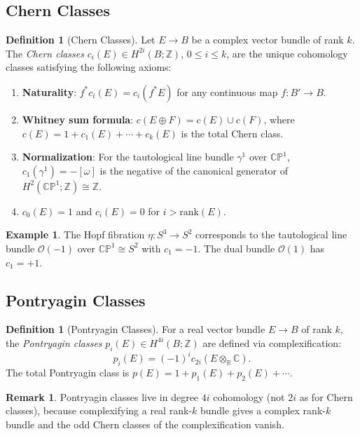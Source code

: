 \documentclass[12pt,a4paper]{amsart}
\theoremstyle{definition}
\newtheorem{definition}[theorem]{Definition}
\newtheorem{example}[theorem]{Example}
\newtheorem{remark}[theorem]{Remark}
\begin{document}
\subsection{Chern Classes}

\begin{definition}[Chern Classes]
Let $E \to B$ be a complex vector bundle of rank $k$. The \emph{Chern classes}
$c_i(E) \in H^{2i}(B; \mathbb{Z})$, $0 \le i \le k$, are the unique
cohomology classes satisfying the following axioms:
\begin{enumerate}[noitemsep]
  \item \textbf{Naturality}: $f^* c_i(E) = c_i(f^*E)$ for any continuous map $f \colon B' \to B$.
  \item \textbf{Whitney sum formula}: $c(E \oplus F) = c(E) \cup c(F)$,
        where $c(E) = 1 + c_1(E) + \cdots + c_k(E)$ is the total Chern class.
  \item \textbf{Normalization}: For the tautological line bundle $\gamma^1$ over
        $\mathbb{CP}^1$, $c_1(\gamma^1) = -[\omega]$ is the negative of the
        canonical generator of $H^2(\mathbb{CP}^1;\mathbb{Z}) \cong \mathbb{Z}$.
  \item $c_0(E) = 1$ and $c_i(E) = 0$ for $i > \mathrm{rank}(E)$.
\end{enumerate}
\end{definition}

\begin{example}
The Hopf fibration $\eta \colon S^3 \to S^2$ corresponds to the tautological
line bundle $\mathcal{O}(-1)$ over $\mathbb{CP}^1 \cong S^2$ with $c_1 = -1$.
The dual bundle $\mathcal{O}(1)$ has $c_1 = +1$.
\end{example}

\subsection{Pontryagin Classes}

\begin{definition}[Pontryagin Classes]
For a real vector bundle $E \to B$ of rank $k$, the \emph{Pontryagin classes}
$p_i(E) \in H^{4i}(B; \mathbb{Z})$ are defined via complexification:
\[
  p_i(E) = (-1)^i c_{2i}(E \otimes_\mathbb{R} \mathbb{C}).
\]
The total Pontryagin class is $p(E) = 1 + p_1(E) + p_2(E) + \cdots$.
\end{definition}

\begin{remark}
Pontryagin classes live in degree $4i$ cohomology (not $2i$ as for Chern
classes), because complexifying a real rank-$k$ bundle gives a complex rank-$k$
bundle and the odd Chern classes of the complexification vanish.
\end{remark}
\end{document}
